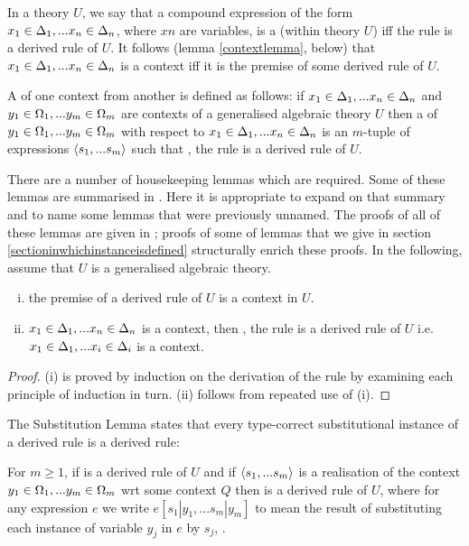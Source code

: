 In a theory $U$, we say that a compound expression of the form $x_1 \in \Delta_1,... x_{n} \in \Delta_{n}$, where $xn$ are variables, is a  (within theory $U$)  iff
the rule  is a derived rule of $U$. It follows (lemma \ref{contextlemma}, below)  that  $x_1 \in \Delta_1,... x_{n} \in \Delta_{n}$ is a context iff
it is the premise of some derived rule of $U$.

A  of one context from another is defined as follows: if $x_1 \in \Delta_1,... x_{n} \in \Delta_{n}$ and $y_1 \in \Omega_1,... y_{m} \in \Omega_{m}$ are contexts of a generalised algebraic theory $U$  then a  of  $y_1 \in \Omega_1,... y_{m} \in \Omega_{m}$ with respect to $x_1 \in \Delta_1,... x_{n} \in \Delta_{n}$ is an $m$-tuple of expressions $\langle s_1,...s_m\rangle$
such that \foreachj, the rule  is a derived rule of $U$.

There are a number of housekeeping lemmas  which are required. Some of these lemmas are summarised in \cite{Cartmell86}. 
Here it is appropriate to expand on that summary and to name some lemmas that were previously unnamed. The proofs of all of these lemmas 
	are given in \cite{Cartmell78}; proofs of some of  lemmas that we give in section \ref{sectioninwhichinstanceisdefined} structurally enrich these proofs.
In the following, assume that $U$ is a generalised algebraic theory.


\begin{lemma}
\begin{enumerate}[(i)]
\item the premise of a derived rule of $U$ is a context in $U$.
\item $x_1 \in \Delta_1,... x_{n} \in \Delta_{n}$ is a context, then \foreachi, the rule  is a derived rule of $U$ i.e.
$x_1 \in \Delta_1,... x_{i} \in \Delta_{i}$ is a context.
\end{enumerate}
\end{lemma}
\begin{proof}
(i) is proved by induction on the derivation of the rule by examining each principle of induction in turn. (ii) follows from repeated use of (i).
\end{proof}

The Substitution Lemma states that every type-correct substitutional instance of a derived rule is a derived rule:
\begin{lemma}
For $m \geq 1$, if  is a derived rule of $U$
and  if $\langle s_1,...s_m\rangle$ is a realisation of the context $y_1 \in \Omega_1,... y_{m} \in \Omega_{m}$ wrt some context $Q$ 
then  is a derived rule of $U$, where
for any expression $e$ we write
$e[s_1|y_1,...s_m|y_m]$ to mean
the result of substituting each instance of variable $y_j$ in $e$ by $s_j$, \foreachj.
\end{lemma}


